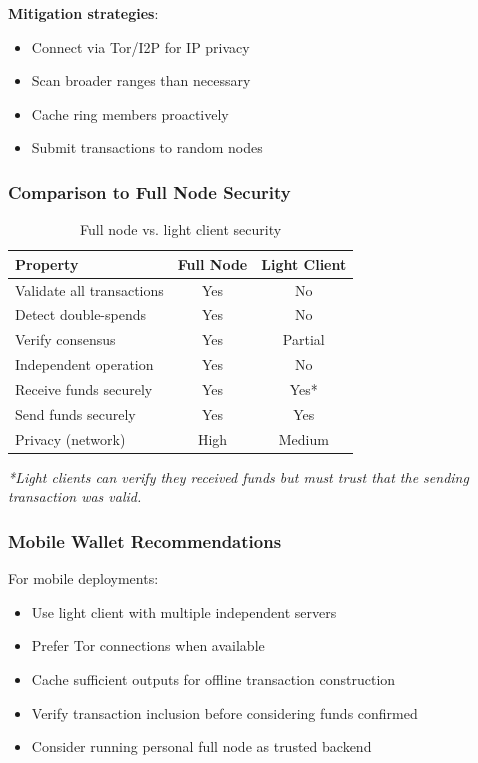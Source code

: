 \textbf{Mitigation strategies}:
\begin{itemize}
  \item Connect via Tor/I2P for IP privacy
  \item Scan broader ranges than necessary
  \item Cache ring members proactively
  \item Submit transactions to random nodes
\end{itemize}

\subsubsection{Comparison to Full Node Security}

\begin{table}[h]
\centering
\caption{Full node vs. light client security}
\label{tab:node-comparison}
\begin{tabular}{@{}lcc@{}}
\toprule
\textbf{Property} & \textbf{Full Node} & \textbf{Light Client} \\
\midrule
Validate all transactions & Yes & No \\
Detect double-spends & Yes & No \\
Verify consensus & Yes & Partial \\
Independent operation & Yes & No \\
Receive funds securely & Yes & Yes* \\
Send funds securely & Yes & Yes \\
Privacy (network) & High & Medium \\
\bottomrule
\end{tabular}
\end{table}

\textit{*Light clients can verify they received funds but must trust that
the sending transaction was valid.}

\subsubsection{Mobile Wallet Recommendations}

For mobile deployments:
\begin{itemize}
  \item Use light client with multiple independent servers
  \item Prefer Tor connections when available
  \item Cache sufficient outputs for offline transaction construction
  \item Verify transaction inclusion before considering funds confirmed
  \item Consider running personal full node as trusted backend
\end{itemize}

